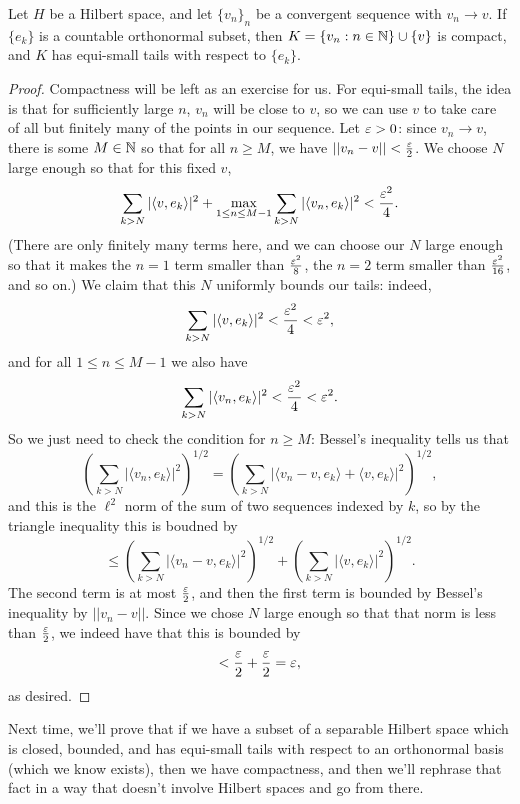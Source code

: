 \begin{theorem}
Let $H$ be a Hilbert space, and let $\{v_n\}_n$ be a convergent sequence with $v_n \to v$. If $\{e_k\}$ is a countable orthonormal subset, then $K = \{v_n: n \in \mathbb N\} \cup \{v\}$ is compact, and $K$ has equi-small tails with respect to $\{e_k\}$.
\end{theorem}

\begin{proof}
Compactness will be left as an exercise for us. For equi-small tails, the idea is that for sufficiently large $n$, $v_n$ will be close to $v$, so we can use $v$ to take care of all but finitely many of the points in our sequence. Let $\varepsilon > 0$: since $v_n \to v$, there is some $M \in \mathbb N$ so that for all $n \ge M$, we have $||v_n - v|| < \frac{\varepsilon}{2}$. We choose $N$ large enough so that for this fixed $v$,
\[
    \sum_{k > N} |\langle v, e_k \rangle|^2 + \max_{1 \le n \le M-1} \sum_{k > N}|\langle v_n, e_k \rangle|^2 < \frac{\varepsilon^2}{4}.
\]
(There are only finitely many terms here, and we can choose our $N$ large enough so that it makes the $n = 1$ term smaller than $\frac{\varepsilon^2}{8}$, the $n = 2$ term smaller than $\frac{\varepsilon^2}{16}$, and so on.) We claim that this $N$ uniformly bounds our tails: indeed, 
\[
    \sum_{k > N} |\langle v, e_k \rangle|^2 < \frac{\varepsilon^2}{4} < \varepsilon^2,
\]
and for all $1 \le n \le M-1$ we also have
\[
    \sum_{k > N} |\langle v_n, e_k \rangle|^2 < \frac{\varepsilon^2}{4} < \varepsilon^2.
\]
So we just need to check the condition for $n \ge M$: Bessel's inequality tells us that
\[
    \left(\sum_{k > N} |\langle v_n, e_k \rangle|^2 \right)^{1/2} = \left(\sum_{k > N} |\langle v_n - v, e_k \rangle + \langle v, e_k \rangle|^2 \right)^{1/2},
\]
and this is the $\ell^2$ norm of the sum of two sequences indexed by $k$, so by the triangle inequality this is boudned by 
\[
    \le \left(\sum_{k>N}|\langle v_n - v, e_k \rangle |^2\right)^{1/2} + \left(\sum_{k>N}|\langle v, e_k \rangle |^2\right)^{1/2}.
\]
The second term is at most $\frac{\varepsilon}{2}$, and then the first term is bounded by Bessel's inequality by $||v_n - v||$. Since we chose $N$ large enough so that that norm is less than $\frac{\varepsilon}{2}$, we indeed have that this is bounded by 
\[
    < \frac{\varepsilon}{2} + \frac{\varepsilon}{2} = \varepsilon,
\]
as desired.
\end{proof}

Next time, we'll prove that if we have a subset of a separable Hilbert space which is closed, bounded, and has equi-small tails with respect to an orthonormal basis (which we know exists), then we have compactness, and then we'll rephrase that fact in a way that doesn't involve Hilbert spaces and go from there.